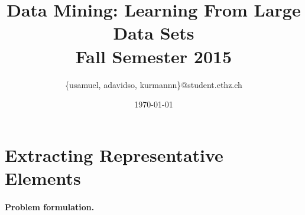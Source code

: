 \documentclass[a4paper, 11pt]{article}
\title{Data Mining: Learning From Large Data Sets\\\vspace{2mm}\Large{Fall Semester 2015}}
\author{\{usamuel, adavidso, kurmannn\}@student.ethz.ch}
\date{\today}
\begin{document}
\maketitle
\thispagestyle{empty}
\pagestyle{empty}

\section*{Extracting Representative Elements} 


\paragraph{Problem formulation.\!\!\!}







\end{document}

